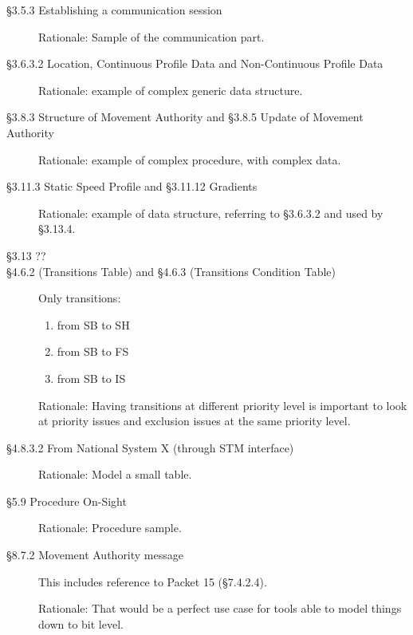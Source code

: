 \documentclass{template/openetcs_article}
\begin{document}
\begin{description}
\item [§3.5.3 Establishing a communication session]

  Rationale: Sample of the communication part.

\item [§3.6.3.2 Location, Continuous Profile Data and Non-Continuous
  Profile Data]

  Rationale: example of complex generic data structure.

\item [§3.8.3 Structure of Movement Authority and §3.8.5 Update of
  Movement Authority]

  Rationale: example of complex procedure, with complex data.

\item [§3.11.3 Static Speed Profile and §3.11.12 Gradients]

  Rationale: example of data structure, referring to §3.6.3.2 and used
  by §3.13.4.

\item [§3.13 ??] 

\item [§4.6.2 (Transitions Table) and §4.6.3 (Transitions Condition
  Table)] Only transitions:
  \begin{enumerate}
  \item from SB to SH
  \item from SB to FS
  \item from SB to IS
  \end{enumerate}

  Rationale: Having transitions at different priority level is
  important to look at priority issues and exclusion issues at the
  same priority level.

\item [§4.8.3.2 From National System X (through STM interface)]

  Rationale: Model a small table.

\item [§5.9 Procedure On-Sight] 

 Rationale: Procedure sample.

\item [§8.7.2 Movement Authority message] This includes reference to
  Packet 15 (§7.4.2.4). 

  Rationale: That would be a perfect use case for tools able to model
  things down to bit level.
\end{description}
\end{document}

